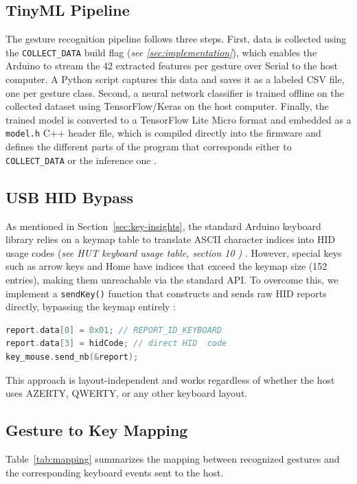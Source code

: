 \documentclass[sigconf,10pt,nonacm]{acmart}
\begin{document}
\subsection{TinyML Pipeline}
The gesture recognition pipeline follows three steps. First, data is collected using the \texttt{COLLECT\_DATA} build flag (\textit{see \ref{sec:implementation}}), which enables the Arduino to stream the 42 extracted features per gesture over Serial to the host computer. A Python script captures this data and saves it as a labeled CSV file, one per gesture class. Second, a neural network classifier is trained offline on the collected dataset using TensorFlow/Keras on the host computer. Finally, the trained model is converted to a TensorFlow Lite Micro format and embedded as a \texttt{model.h} C++ header file, which is compiled directly into the firmware and defines the different parts of the program that corresponds either to \texttt{COLLECT\_DATA} or the inference one .

\subsection{USB HID Bypass}
As mentioned in Section~\ref{sec:key-insights}, the standard Arduino keyboard library relies on a keymap table to translate ASCII character indices into HID usage codes (\textit{see HUT keyboard usage table, section 10 \cite{Hut})} . However, special keys such as arrow keys and Home have indices that exceed the keymap size (152 entries), making them unreachable via the standard API. To overcome this, we implement a \texttt{sendKey()} function that constructs and sends raw HID reports directly, bypassing the keymap entirely :

\begin{lstlisting}[language=C++, caption=Raw HID report bypassing the keymap]
report.data[0] = 0x01; // REPORT_ID_KEYBOARD
report.data[3] = hidCode; // direct HID  code
key_mouse.send_nb(&report);
\end{lstlisting}

This approach is layout-independent and works regardless of whether the host uses AZERTY, QWERTY, or any other keyboard layout.

\subsection{Gesture to Key Mapping}
Table~\ref{tab:mapping} summarizes the mapping between recognized gestures and the corresponding keyboard events sent to the host.
\end{document}
